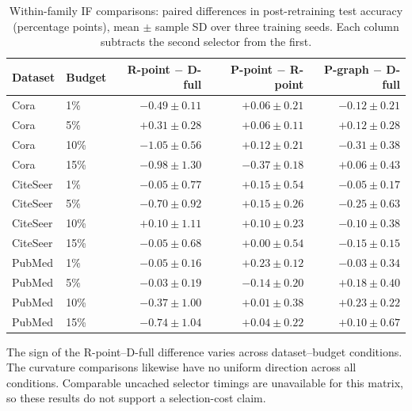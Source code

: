 \begin{table}[htbp]
\centering
\small
\setlength{\tabcolsep}{4pt}
\caption{Within-family IF comparisons: paired differences in post-retraining test accuracy (percentage points), mean $\pm$ sample SD over three training seeds. Each column subtracts the second selector from the first.}
\label{tab:if-family}
\begin{tabular}{llrrr}
\toprule
Dataset & Budget & R-point $-$ D-full & P-point $-$ R-point & P-graph $-$ D-full \\
\midrule
Cora & 1\% & $-0.49\pm0.11$ & $+0.06\pm0.21$ & $-0.12\pm0.21$ \\
Cora & 5\% & $+0.31\pm0.28$ & $+0.06\pm0.11$ & $+0.12\pm0.28$ \\
Cora & 10\% & $-1.05\pm0.56$ & $+0.12\pm0.21$ & $-0.31\pm0.38$ \\
Cora & 15\% & $-0.98\pm1.30$ & $-0.37\pm0.18$ & $+0.06\pm0.43$ \\
CiteSeer & 1\% & $-0.05\pm0.77$ & $+0.15\pm0.54$ & $-0.05\pm0.17$ \\
CiteSeer & 5\% & $-0.70\pm0.92$ & $+0.15\pm0.26$ & $-0.25\pm0.63$ \\
CiteSeer & 10\% & $+0.10\pm1.11$ & $+0.10\pm0.23$ & $-0.10\pm0.38$ \\
CiteSeer & 15\% & $-0.05\pm0.68$ & $+0.00\pm0.54$ & $-0.15\pm0.15$ \\
PubMed & 1\% & $-0.05\pm0.16$ & $+0.23\pm0.12$ & $-0.03\pm0.34$ \\
PubMed & 5\% & $-0.03\pm0.19$ & $-0.14\pm0.20$ & $+0.18\pm0.40$ \\
PubMed & 10\% & $-0.37\pm1.00$ & $+0.01\pm0.38$ & $+0.23\pm0.22$ \\
PubMed & 15\% & $-0.74\pm1.04$ & $+0.04\pm0.22$ & $+0.10\pm0.67$ \\
\bottomrule
\end{tabular}
\end{table}

The sign of the R-point--D-full difference varies across dataset--budget conditions. The curvature comparisons likewise have no uniform direction across all conditions. Comparable uncached selector timings are unavailable for this matrix, so these results do not support a selection-cost claim.

